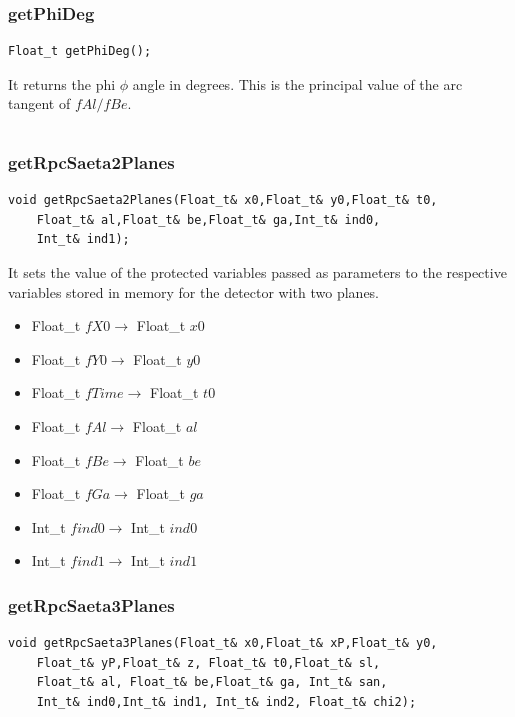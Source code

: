 \documentclass[a4paper]{book}
\begin{document}
\[\]

\subsubsection{getPhiDeg}

\begin{lstlisting}
Float_t getPhiDeg();
\end{lstlisting}

It returns the phi $\phi$ angle in degrees. This is the principal value of the arc tangent of $fAl/fBe$.

\[\]

\subsubsection{getRpcSaeta2Planes}

\begin{lstlisting}
void getRpcSaeta2Planes(Float_t& x0,Float_t& y0,Float_t& t0,
	Float_t& al,Float_t& be,Float_t& ga,Int_t& ind0,
	Int_t& ind1);
\end{lstlisting}

It sets the value of the protected variables passed as parameters to the respective variables stored in memory for the detector with two planes.

\begin{itemize}
	\item Float\_t $fX0 \rightarrow$ Float\_t $x0$
	\item Float\_t $fY0 \rightarrow$ Float\_t $y0$
	\item Float\_t $fTime \rightarrow$ Float\_t $t0$
	\item Float\_t $fAl \rightarrow$ Float\_t $al$
	\item Float\_t $fBe \rightarrow$ Float\_t $be$
	\item Float\_t $fGa \rightarrow$ Float\_t $ga$
	\item Int\_t $find0 \rightarrow$ Int\_t $ind0$
	\item Int\_t $find1 \rightarrow$ Int\_t $ind1$
\end{itemize}

\subsubsection{getRpcSaeta3Planes}

\begin{lstlisting}
void getRpcSaeta3Planes(Float_t& x0,Float_t& xP,Float_t& y0,
	Float_t& yP,Float_t& z, Float_t& t0,Float_t& sl,
	Float_t& al, Float_t& be,Float_t& ga, Int_t& san,
	Int_t& ind0,Int_t& ind1, Int_t& ind2, Float_t& chi2);
\end{lstlisting}
\end{document}

